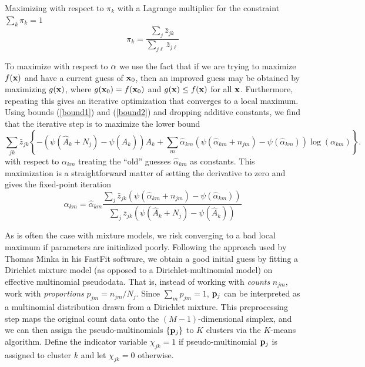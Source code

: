 \documentclass[nofootinbib,amssymb,amsmath]{revtex4}
\begin{document}
Maximizing with respect to $\pi_k$ with a Lagrange multiplier for the constraint $\sum_k \pi_k = 1$
\begin{equation}
\label{DMM_M_step_pi}
\pi_k = \frac{ \sum_j \bar{z}_{jk} }{\sum_{j \ell} \bar{z}_{j \ell}}
\end{equation}

To maximize with respect to ${\bf \alpha}$ we use the fact that if we are trying to maximize $f({\bf x})$ and have a current guess of ${{\bf x}_0}$, then an improved guess may be obtained by maximizing $g({\bf x})$, where $g({\bf x}_0) = f({\bf x}_0)$ and $g({\bf x}) \le f({\bf x})$ for all ${\bf x}$.  Furthermore, repeating this gives an iterative optimization that converges to a local maximum.  Using bounds (\ref{bound1}) and (\ref{bound2}) and dropping additive constants, we find that the iterative step is to maximize the lower bound
\begin{equation}
\sum_{jk}  \bar{z}_{jk} \left\{ - \left( \psi(\hat{A}_k + N_j) - \psi(\hat{A}_k) \right) A_k + \sum_m \hat{\alpha}_{km}  \left( \psi(\hat{\alpha}_{km}  + n_{jm}) - \psi(\hat{\alpha}_{km}) \right)  \log(\alpha_{km} )   \right\}.
\end{equation}
with respect to $\alpha_{km}$ treating the ``old'' guesses $\hat{\alpha}_{km}$ as constants.  This maximization is a straightforward matter of setting the derivative to zero and gives the fixed-point iteration
\begin{equation}
\label{DMMiteration}
\alpha_{km} = \hat{\alpha}_{km} \frac{\sum_j \bar{z}_{jk}  \left( \psi(\hat{\alpha}_{km}  + n_{jm}) - \psi(\hat{\alpha}_{km}) \right)} {\sum_j \bar{z}_{jk} \left( \psi(\hat{A}_k + N_j) - \psi(\hat{A}_k) \right)}
\end{equation}

As is often the case with mixture models, we risk converging to a bad local maximum if parameters are initialized poorly.  Following the approach used by Thomas Minka in his FastFit software, we obtain a good initial guess by fitting a Dirichlet mixture model (as opposed to a Dirichlet-multinomial model) on effective multinomial pseudodata.  That is, instead of working with \textit{counts} $n_{jm}$, work with \textit{proportions} $p_{jm} = n_{jm} / N_j$.  Since $\sum_m p_{jm} = 1$, ${\bf p}_j$ can be interpreted as a multinomial distribution drawn from a Dirichlet mixture.  This preprocessing step maps the original count data onto the $(M-1)$-dimensional simplex, and we can then assign the pseudo-multinomials $\{ {\bf p}_j \}$ to $K$ clusters via the $K$-means algorithm.  Define the indicator variable $\chi_{jk} = 1$ if pseudo-multinomial ${\bf p}_j$ is assigned to cluster $k$ and let $\chi_{jk} = 0$ otherwise.
\end{document}
